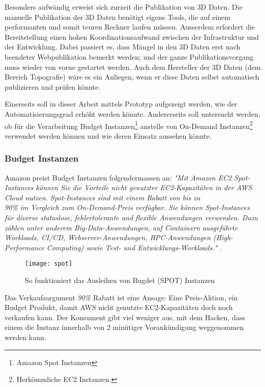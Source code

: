 Besonders aufwändig erweist sich zurzeit die Publikation von 3D Daten. Die manuelle Publikation
der 3D Daten benötigt eigene Tools, die auf einem performanten und somit teuren Rechner laufen
müssen. Ausserdem erfordert die Bereitstellung einen hohen Koordinationsaufwand zwischen der
Infrastruktur und der Entwicklung. Dabei passiert es, dass Mängel in den 3D Daten erst nach
beendeter Webpublikation bemerkt werden; und der ganze Publikationsvorgang muss wieder von
vorne gestartet werden.
Auch dem Hersteller der 3D Daten (dem Bereich Topografie) wäre es ein Anliegen, wenn er diese
Daten selbst automatisch publizieren und prüfen könnte.

Einerseits soll in dieser Arbeit mittels Prototyp aufgezeigt werden, wie der Automatisierungsgrad erhöht werden könnte. Andererseits soll untersucht werden, ob für die Verarbeitung Budget Instanzen\footnote{Amazon Spot Instanzen} anstelle von On-Demand Instanzen\footnote{Herkömmliche EC2 Instanzen.} verwendet werden können und wie deren Einsatz aussehen könnte.

\subsubsection{Budget Instanzen}\label{kap:bugdet_instanzen}
Amazon preist Budget Instanzen folgendermassen an: \textit{"Mit Amazon EC2 Spot-Instances können Sie die Vorteile nicht genutzter EC2-Kapazitäten in der AWS Cloud nutzen. Spot-Instances sind mit einem Rabatt von bis zu\\ 90\% im Vergleich zum On-Demand-Preis verfügbar. Sie können Spot-Instances für diverse statuslose, fehlertolerante und flexible Anwendungen verwenden. Dazu zählen unter anderem Big-Data-Anwendungen, auf Containern ausgeführte Workloads, CI/CD, Webserver-Anwendungen, HPC-Anwendungen (High-Performance Computing) sowie Test- und Entwicklungs-Workloads."} \cite{AmazonAWSSpot:1}.


\begin{figure}[H]
	\centering
	\texttt{[image: spot]}
	\caption{So funktioniert das Ausleihen von Bugdet (SPOT) Instanzen}
	\label{fig:spot}
\end{figure}

Das Verkaufsargument \emph{90\%} Rabatt ist eine Ansage: Eine Preis-Aktion, ein Budget Produkt, damit AWS nicht genutzte EC2-Kapazitäten doch noch verkaufen kann. Der Konsument gibt viel weniger aus, mit dem Hacken, dass einem die Instanz innerhalb von 2 minütiger Vorankündigung weggenommen werden kann.

